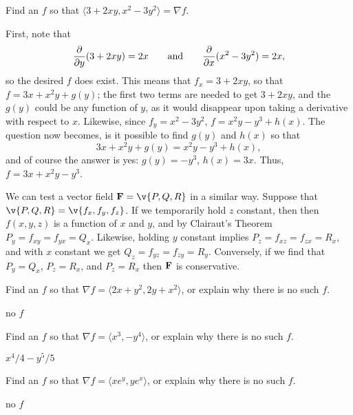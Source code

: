 \begin{theorem}
\begin{example} Find an $f$ so that $\langle 3+2xy,x^2-3y^2\rangle = \nabla f$.

First, note that 
$${\partial\over\partial y}(3+2xy)=2x\qquad\hbox{and}\qquad
{\partial\over\partial x}(x^2-3y^2)=2x,$$
so the desired $f$ does exist. This means that $f_x=3+2xy$, so that
$f=3x+x^2y+g(y)$; the first two terms are needed to get $3+2xy$, and
the $g(y)$ could be any function of $y$, as it would disappear upon
taking a derivative with respect to $x$. Likewise, since
$f_y=x^2-3y^2$, $f=x^2y-y^3+h(x)$. The question now becomes, is it
possible to find $g(y)$ and $h(x)$ so that
$$3x+x^2y+g(y)=x^2y-y^3+h(x),$$
and of course the answer is yes: $g(y)=-y^3$, $h(x)=3x$. Thus,
$f=3x+x^2y-y^3$.
\end{example}

We can test a vector field ${\bf F}=\v{P,Q,R}$ in a similar
way. Suppose that $\v{P,Q,R}=\v{f_x,f_y,f_z}$. If we temporarily hold
$z$ constant, then then $f(x,y,z)$ is a function of $x$ and $y$, and
by Clairaut's Theorem $P_y=f_{xy}=f_{yx}=Q_x$.
Likewise, holding $y$ constant implies $P_z=f_{xz}=f_{zx}=R_x$, and
with $x$ constant we get $Q_z=f_{yz}=f_{zy}=R_y$. Conversely, if we
find that $P_y=Q_x$, $P_z=R_x$, and $P_z=R_x$ then $\bf F$ is
conservative.

\begin{exercises}


\begin{exercise} Find an $f$ so that $\nabla f=\langle 2x+y^2,2y+x^2\rangle$, or
explain why there is no such $f$.
\begin{answer} no $f$
\end{answer}\end{exercise}

\begin{exercise} Find an $f$ so that $\nabla f=\langle x^3,-y^4\rangle$, 
or explain why there is no such $f$.
\begin{answer} $x^4/4-y^5/5$
\end{answer}\end{exercise}

\begin{exercise} Find an $f$ so that $\nabla f=\langle xe^y,ye^x \rangle$, 
or explain why there is no such $f$.
\begin{answer}  no $f$
\end{answer}\end{exercise}


\end{exercises}
\end{theorem}
